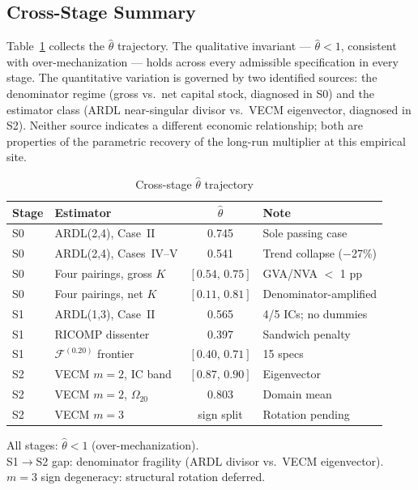 \documentclass[11pt,a4paper]{article}
\begin{document}
\subsection{Cross-Stage Summary}
\label{subsec:cross_stage}

Table~\ref{tab:cross_theta} collects the $\hat{\theta}$ trajectory. The
qualitative invariant --- $\hat{\theta} < 1$, consistent with
over-mechanization --- holds across every admissible specification in every
stage. The quantitative variation is governed by two identified sources: the
denominator regime (gross vs.\ net capital stock, diagnosed in S0) and the
estimator class (ARDL near-singular divisor vs.\ VECM eigenvector, diagnosed
in S2). Neither source indicates a different economic relationship; both are
properties of the parametric recovery of the long-run multiplier at this
empirical site.

\begin{table}[!ht]
	\centering
	\small
	\caption{Cross-stage $\hat{\theta}$ trajectory}
	\label{tab:cross_theta}
	\begin{tabular}{llcl}
		\hline\hline
		Stage & Estimator & $\hat{\theta}$ & Note \\
		\hline
		S0 & ARDL(2,4), Case~II & 0.745 &
			Sole passing case \\
		S0 & ARDL(2,4), Cases~IV--V & 0.541 &
			Trend collapse ($-$27\%) \\
		S0 & Four pairings, gross $K$ & $[0.54,\, 0.75]$ &
			GVA/NVA $<$ 1 pp \\
		S0 & Four pairings, net $K$ & $[0.11,\, 0.81]$ &
			Denominator-amplified \\
		\hline
		S1 & ARDL(1,3), Case~II & 0.565 &
			4/5 ICs; no dummies \\
		S1 & RICOMP dissenter & 0.397 &
			Sandwich penalty \\
		S1 & $\mathcal{F}^{(0.20)}$ frontier & $[0.40,\, 0.71]$ &
			15 specs \\
		\hline
		S2 & VECM $m\!=\!2$, IC band & $[0.87,\, 0.90]$ &
			Eigenvector \\
		S2 & VECM $m\!=\!2$, $\Omega_{20}$ & 0.803 &
			Domain mean \\
		S2 & VECM $m\!=\!3$ & sign split &
			Rotation pending \\
		\hline
	\end{tabular}
	\par\vspace{0.3em}
	\footnotesize
	All stages: $\hat{\theta} < 1$ (over-mechanization). \\
	S1$\to$S2 gap: denominator fragility (ARDL divisor vs.\ VECM eigenvector). \\
	$m=3$ sign degeneracy: structural rotation deferred.
\end{table}
\end{document}
